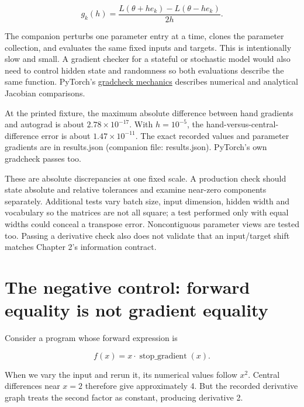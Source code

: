 \begin{equation}
g_k(h)=\frac{L(\theta+he_k)-L(\theta-he_k)}{2h}.
\end{equation}

The companion perturbs one parameter entry at a time, clones the
parameter collection, and evaluates the same fixed inputs and targets.
This is intentionally slow and small. A gradient checker for a stateful
or stochastic model would also need to control hidden state and
randomness so both evaluations describe the same function. PyTorch's
\href{https://docs.pytorch.org/docs/2.10/notes/gradcheck.html}{gradcheck
mechanics} describes numerical and analytical Jacobian comparisons.

At the printed fixture, the maximum absolute difference between hand
gradients and autograd is about \(2.78\times10^{-17}\). With
\(h=10^{-5}\), the hand-versus-central-difference error is about
\(1.47\times10^{-11}\). The exact recorded values and parameter
gradients are in results.json (companion file: results.json). PyTorch's
own gradcheck passes too.

These are absolute discrepancies at one fixed scale. A production check
should state absolute and relative tolerances and examine near-zero
components separately. Additional tests vary batch size, input
dimension, hidden width and vocabulary so the matrices are not all
square; a test performed only with equal widths could conceal a
transpose error. Noncontiguous parameter views are tested too. Passing a
derivative check also does not validate that an input/target shift
matches Chapter 2's information contract.

\section{The negative control: forward equality is not gradient
equality}\label{the-negative-control-forward-equality-is-not-gradient-equality}

Consider a program whose forward expression is

\begin{equation}
f(x)=x\cdot\operatorname{stop\_gradient}(x).
\end{equation}

When we vary the input and rerun it, its numerical values follow
\(x^2\). Central differences near \(x=2\) therefore give approximately
4. But the recorded derivative graph treats the second factor as
constant, producing derivative 2.


